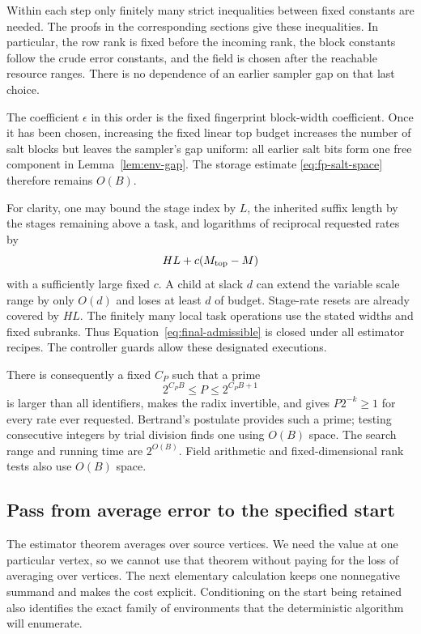 Within each step only finitely many strict inequalities between
fixed constants are needed. The proofs in the corresponding sections
give these inequalities. In particular, the row rank is fixed before
the incoming rank, the block constants follow the crude error
constants, and the field is chosen after the reachable resource
ranges. There is no dependence of an earlier sampler gap on that
last choice.

The coefficient $\epsilon$ in this order is the fixed fingerprint
block-width coefficient. Once it has been chosen, increasing the fixed
linear top budget increases the number of salt blocks but leaves the
sampler's gap uniform: all earlier salt bits form one free component in
Lemma~\ref{lem:env-gap}. The storage estimate
\eqref{eq:fp-salt-space} therefore remains $O(B)$.

For clarity, one may bound the stage index by $L$, the inherited
suffix length by the stages remaining above a task, and logarithms
of reciprocal requested rates by
\begin{equation}\label{eq:final-admissible}
HL+c(M_{\rm top}-M)
\end{equation}
with a sufficiently large fixed $c$. A child at slack $d$ can extend
the variable scale range by only $O(d)$ and loses at least $d$ of
budget. Stage-rate resets are already covered by $HL$.
The finitely many local task operations use the stated widths and
fixed subranks. Thus Equation~\eqref{eq:final-admissible} is closed
under all estimator recipes. The controller guards allow these
designated executions.

There is consequently a fixed $C_P$ such that a prime
\[
2^{C_PB}\le P\le 2^{C_PB+1}
\]
is larger than all identifiers, makes the radix invertible, and gives
$P2^{-k}\ge1$ for every rate ever requested. Bertrand's postulate
provides such a prime; testing consecutive integers by trial division
finds one using $O(B)$ space. The search range and running time are
$2^{O(B)}$. Field arithmetic and fixed-dimensional rank tests also
use $O(B)$ space.

\subsection{Pass from average error to the specified start}

The estimator theorem averages over source vertices. We need the value at one particular vertex, so we cannot use that theorem without paying for the loss of averaging over vertices. The next elementary calculation keeps one nonnegative summand and makes the cost explicit. Conditioning on the start being retained also identifies the exact family of environments that the deterministic algorithm will enumerate.

